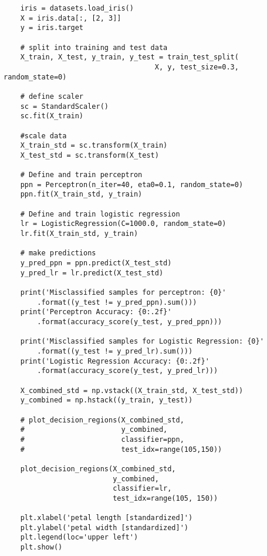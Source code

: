 \documentclass[12pt]{article}
\begin{document}
\begin{verbatim}
    iris = datasets.load_iris()
    X = iris.data[:, [2, 3]]
    y = iris.target
    
    # split into training and test data
    X_train, X_test, y_train, y_test = train_test_split(
                                    X, y, test_size=0.3, random_state=0)
    
    # define scaler
    sc = StandardScaler()
    sc.fit(X_train)
    
    #scale data
    X_train_std = sc.transform(X_train)
    X_test_std = sc.transform(X_test)
    
    # Define and train perceptron
    ppn = Perceptron(n_iter=40, eta0=0.1, random_state=0)
    ppn.fit(X_train_std, y_train)
    
    # Define and train logistic regression
    lr = LogisticRegression(C=1000.0, random_state=0)
    lr.fit(X_train_std, y_train)
    
    # make predictions 
    y_pred_ppn = ppn.predict(X_test_std)
    y_pred_lr = lr.predict(X_test_std)
    
    print('Misclassified samples for perceptron: {0}'
        .format((y_test != y_pred_ppn).sum()))
    print('Perceptron Accuracy: {0:.2f}'
        .format(accuracy_score(y_test, y_pred_ppn)))
    
    print('Misclassified samples for Logistic Regression: {0}'
        .format((y_test != y_pred_lr).sum()))
    print('Logistic Regression Accuracy: {0:.2f}'
        .format(accuracy_score(y_test, y_pred_lr)))
    
    X_combined_std = np.vstack((X_train_std, X_test_std))
    y_combined = np.hstack((y_train, y_test))
    
    # plot_decision_regions(X_combined_std,
    #                       y_combined,
    #                       classifier=ppn,
    #                       test_idx=range(105,150))
    
    plot_decision_regions(X_combined_std,
                          y_combined,
                          classifier=lr,
                          test_idx=range(105, 150))
    
    plt.xlabel('petal length [standardized]') 
    plt.ylabel('petal width [standardized]') 
    plt.legend(loc='upper left')
    plt.show()
    
    
\end{verbatim}
\end{document}

